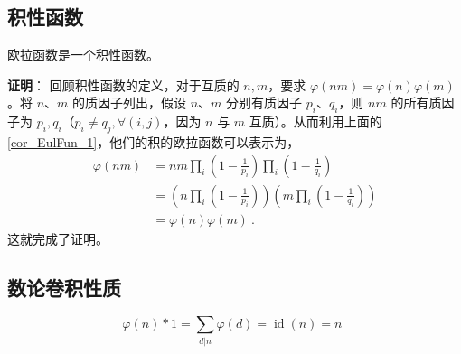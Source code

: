 \subsection{积性函数}
\begin{theorem}{}
欧拉函数是一个积性函数。
\end{theorem}
\textbf{证明}：
回顾积性函数的定义，对于互质的 $n, m$，要求 $\varphi(n m ) = \varphi(n) \varphi(m)$。将 $n$、$m$ 的质因子列出，假设 $n$、$m$ 分别有质因子 $p_i$、$q_i$，则 $nm$ 的所有质因子为 $p_i, q_i$（$p_i \neq q_j, \forall (i, j)$，因为 $n$ 与 $m$ 互质）。从而利用上面的\autoref{cor_EulFun_1}，他们的积的欧拉函数可以表示为，
\begin{equation}
\begin{aligned}
\varphi(n m) &= nm \prod_i \left(1-\frac1{p_i}\right) \prod_i \left(1-\frac1{q_i}\right)\\
&= \left(n \prod_i \left(1 - \frac1{p_i}\right)\right) \left(m \prod_i \left(1 - \frac1{q_i}\right)\right)\\
&= \varphi(n) \varphi(m) ~.
\end{aligned}
\end{equation}
这就完成了证明。

\subsection{数论卷积性质}
\begin{theorem}{}
\begin{equation}
\varphi(n) * 1 = \sum_{d | n} \varphi(d) = \operatorname{id}(n) = n ~~
\end{equation}

\end{theorem}